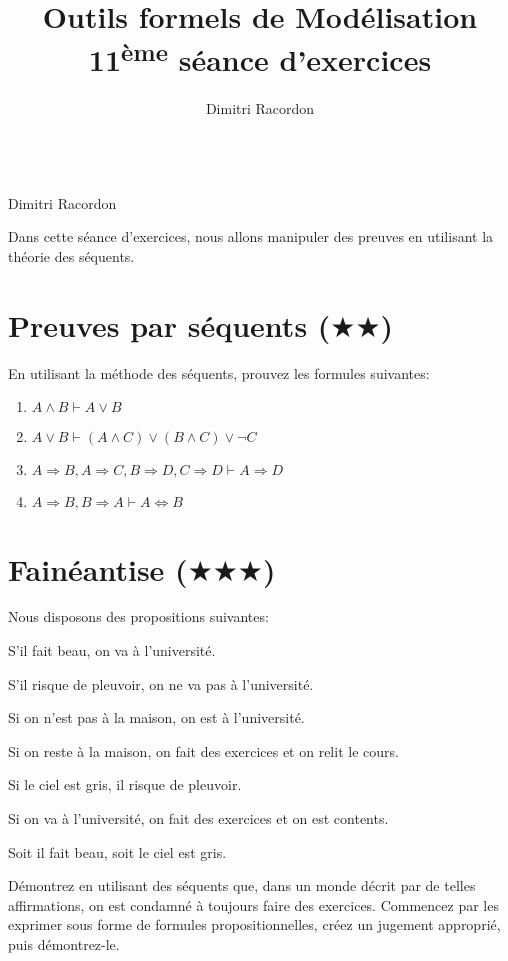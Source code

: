 \documentclass[a4paper, titlepage]{article}
\makeatletter
\numberwithin{figure}{section}
\numberwithin{table}{section}
\newcommand\objective[1]{\def\@objective{#1}}
\newcommand{\makecustomtitle}{%
	\begin{center}
		\huge\@title \\
		[1ex]\small Dimitri Racordon \\
	\end{center}
	\@objective
}
\makeatother
\begin{document}
  \title{Outils formels de Modélisation \\ 11\textsuperscript{ème} séance d'exercices}
  \author{Dimitri Racordon}
	\objective{
    Dans cette séance d'exercices,
    nous allons manipuler des preuves en utilisant la théorie des séquents.
  }

	\makecustomtitle

  \section{Preuves par séquents ($\bigstar\bigstar$)}
    En utilisant la méthode des séquents, prouvez les formules suivantes:
    \begin{enumerate}
      \item $A \land B \vdash A \vee B$
      \item $A \vee B \vdash (A \land C) \vee (B \land C) \vee \neg C$
      \item $A \Rightarrow B, A \Rightarrow C, B \Rightarrow D, C \Rightarrow D \vdash A \Rightarrow D$
      \item $A \Rightarrow B, B \Rightarrow A \vdash A \Leftrightarrow B$
    \end{enumerate}

  \section{Fainéantise ($\bigstar\bigstar\bigstar$)}
    Nous disposons des propositions suivantes:
    \begin{compactitem}
      \item S'il fait beau, on va à l'université.
      \item S'il risque de pleuvoir, on ne va pas à l'université.
      \item Si on n'est pas à la maison, on est à l'université.
      \item Si on reste à la maison, on fait des exercices et on relit le cours.
      \item Si le ciel est gris, il risque de pleuvoir.
      \item Si on va à l'université, on fait des exercices et on est contents.
      \item Soit il fait beau, soit le ciel est gris.
    \end{compactitem}

    Démontrez en utilisant des séquents que, dans un monde décrit par de telles affirmations,
    on est condamné à toujours faire des exercices.
    Commencez par les exprimer sous forme de formules propositionnelles,
    créez un jugement approprié, puis démontrez-le.
\end{document}
